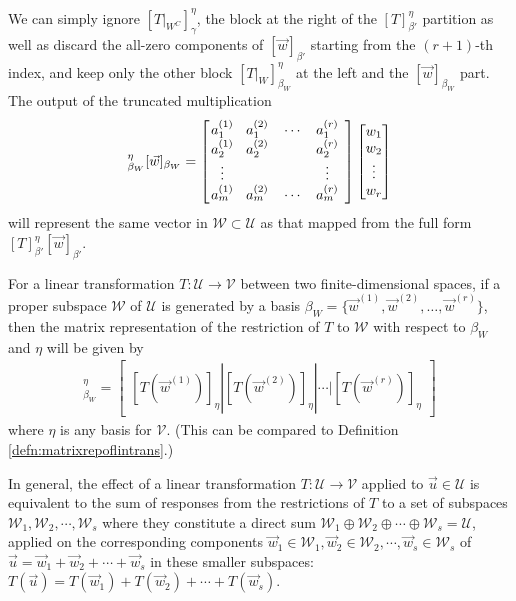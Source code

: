 We can simply ignore $[T|_{W^C}]_\gamma^\eta$, the block at the right of the $[T]_{\beta'}^\eta$ partition as well as discard the all-zero components of $[\vec{w}]_{\beta'}$ starting from the $(r+1)$-th index, and keep only the other block $[T|_{W}]_{\beta_W}^\eta$ at the left and the $[\vec{w}]_{\beta_W}$ part. The output of the truncated multiplication
\begin{align}
[T|_{W}]_{\beta_W}^\eta [\vec{w}]_{\beta_W} = 
\left[\begin{array}{@{\,}wc{15pt}wc{15pt}wc{15pt}wc{15pt}}
a_1^{(1)} & a_1^{(2)} & \cdots & a_1^{(r)} \\
a_2^{(1)} & a_2^{(2)} & & a_2^{(r)} \\
\vdots & & & \vdots \\
a_m^{(1)} & a_m^{(2)} & \cdots & a_m^{(r)} 
\end{array}\right]
\begin{bmatrix}
w_1 \\
w_2 \\
\vdots \\
w_r \\
\end{bmatrix}
\end{align}
will represent the same vector in $\mathcal{W} \subset \mathcal{U}$ as that mapped from the full form $[T]_{\beta'}^\eta[\vec{w}]_{\beta'}$.
\begin{proper}
\label{proper:restrictmat}
For a linear transformation $T: \mathcal{U} \to \mathcal{V}$ between two finite-dimensional spaces, if a proper subspace $\mathcal{W}$ of $\mathcal{U}$ is generated by a basis $\mathcal{\beta}_W = \{\vec{w}^{(1)}, \vec{w}^{(2)}, \ldots, \vec{w}^{(r)}\}$, then the matrix representation of the restriction of $T$ to $\mathcal{W}$ with respect to $\mathcal{\beta}_W$ and $\mathcal{\eta}$ will be given by
\begin{align}
[T|_{W}]_{\beta_W}^\eta = \begin{bmatrix}
[T(\vec{w}^{(1)})]_\eta | [T(\vec{w}^{(2)})]_\eta | \cdots | [T(\vec{w}^{(r)})]_\eta
\end{bmatrix}    
\end{align}
where $\mathcal{\eta}$ is any basis for $\mathcal{V}$. (This can be compared to Definition \ref{defn:matrixrepoflintrans}.)
\end{proper}
In general, the effect of a linear transformation $T: \mathcal{U} \to \mathcal{V}$ applied to $\vec{u} \in \mathcal{U}$ is equivalent to the sum of responses from the restrictions of $T$ to a set of subspaces $\mathcal{W}_1, \mathcal{W}_2, \cdots, \mathcal{W}_s$ where they constitute a direct sum $\mathcal{W}_1 \oplus \mathcal{W}_2 \oplus \cdots \oplus \mathcal{W}_s = \mathcal{U}$, applied on the corresponding components $\vec{w}_1 \in \mathcal{W}_1, \vec{w}_2 \in \mathcal{W}_2, \cdots, \vec{w}_s \in \mathcal{W}_s$ of $\vec{u} = \vec{w}_1 + \vec{w}_2 + \cdots + \vec{w}_s$ in these smaller subspaces: $T(\vec{u}) = T(\vec{w}_1) + T(\vec{w}_2) + \cdots + T(\vec{w}_s)$.
